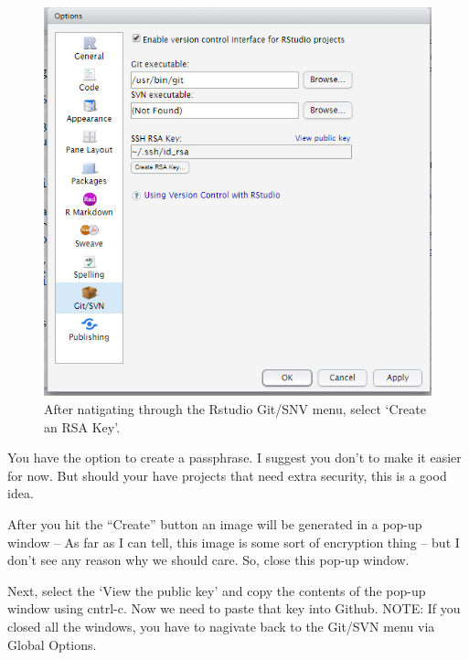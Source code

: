 \documentclass[12pt]{../SOP3_beta}
\begin{document}
\begin{figure}
\includegraphics{graphics/CreatingSSH.jpg}
\caption{After natigating through the Rstudio Git/SNV menu, select `Create an RSA Key'.}
\end{figure}

\NP You have the option to create a passphrase. I suggest you don't to make it easier for now. But should your have projects that need extra security, this is a good idea.

\NP After you hit the ``Create'' button an image will be generated in a pop-up window -- As far as I can tell, this image is some sort of encryption thing -- but I don't see any reason why we should care. So, close this pop-up window. 

\NP Next, select the `View the public key' and copy the contents of the pop-up window using cntrl-c. Now we need to paste that key into Github. NOTE: If you closed all the windows, you have to nagivate back to the Git/SVN menu via Global Options. 
\end{document}
